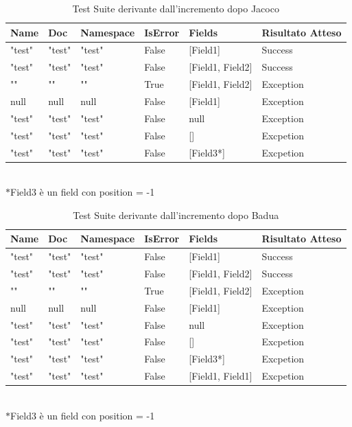 \documentclass[10pt, a4paper]{article}
\begin{document}
\begin{table}[ht]
  \centering
  \caption[CreateRecord: Test Suite - Adequacy Control Flow]{Test Suite derivante dall'incremento dopo Jacoco}
  \begin{tabular}{|l|l|l|l|l|l|}
    \hline
    \textbf{Name} & \textbf{Doc} & \textbf{Namespace}  & \textbf{IsError} & \textbf{Fields} & \textbf{Risultato Atteso} \\
    \hline
    "test" & "test" & "test" & False & [Field1] & Success \\
    "test" & "test" & "test" & False & [Field1, Field2] & Success \\
    "" & "" & "" & True & [Field1, Field2] & Exception \\
    null & null & null & False & [Field1] & Exception \\
    "test" & "test" & "test" & False & null & Exception \\
    "test" & "test" & "test" & False & [] & Excpetion \\
    "test" & "test" & "test" & False & [Field3*] & Excpetion \\
    \hline
  \end{tabular}
   \\$\ast$Field3 è un field con position = -1
  \label{tab:Jacoco1CreateRecord}
\end{table}

\begin{table}[ht]
  \centering
  \caption[CreateRecord: Test Suite - Adequacy Control Flow]{Test Suite derivante dall'incremento dopo Badua}
  \begin{tabular}{|l|l|l|l|l|l|}
    \hline
    \textbf{Name} & \textbf{Doc} & \textbf{Namespace}  & \textbf{IsError} & \textbf{Fields} & \textbf{Risultato Atteso} \\
    \hline
    "test" & "test" & "test" & False & [Field1] & Success \\
    "test" & "test" & "test" & False & [Field1, Field2] & Success \\
    "" & "" & "" & True & [Field1, Field2] & Exception \\
    null & null & null & False & [Field1] & Exception \\
    "test" & "test" & "test" & False & null & Exception \\
    "test" & "test" & "test" & False & [] & Excpetion \\
    "test" & "test" & "test" & False & [Field3*] & Excpetion \\
    "test" & "test" & "test" & False & [Field1, Field1] & Excpetion \\
    \hline
  \end{tabular}
   \\$\ast$Field3 è un field con position = -1
  \label{tab:Badua1CreateRecord}
\end{table}
  
\end{document}
